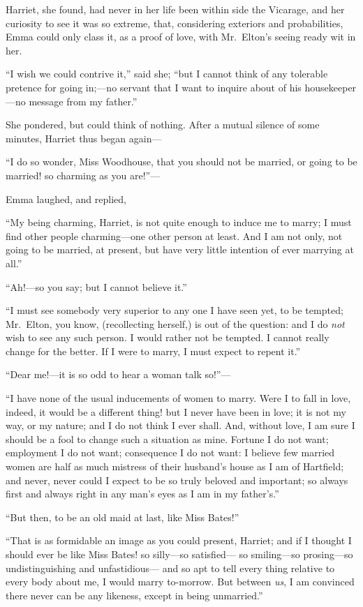 Harriet, she found, had never in her life been within side the Vicarage,
and her curiosity to see it was so extreme, that, considering exteriors
and probabilities, Emma could only class it, as a proof of love,
with Mr.\ Elton's seeing ready wit in her.

``I wish we could contrive it,'' said she; ``but I cannot think
of any tolerable pretence for going in;---no servant that I want
to inquire about of his housekeeper---no message from my father.''

She pondered, but could think of nothing.  After a mutual silence
of some minutes, Harriet thus began again---%

``I do so wonder, Miss Woodhouse, that you should not be married,
or going to be married! so charming as you are!''---%

Emma laughed, and replied,

``My being charming, Harriet, is not quite enough to induce me to marry;
I must find other people charming---one other person at least.
And I am not only, not going to be married, at present, but have
very little intention of ever marrying at all.''

``Ah!---so you say; but I cannot believe it.''

``I must see somebody very superior to any one I have seen yet,
to be tempted; Mr.\ Elton, you know, (recollecting herself,)
is out of the question:  and I do \emph{not} wish to see any such person.
I would rather not be tempted.  I cannot really change for the better.
If I were to marry, I must expect to repent it.''

``Dear me!---it is so odd to hear a woman talk so!''---%

``I have none of the usual inducements of women to marry.
Were I to fall in love, indeed, it would be a different thing!
but I never have been in love; it is not my way, or my nature;
and I do not think I ever shall.  And, without love, I am sure I
should be a fool to change such a situation as mine.  Fortune I
do not want; employment I do not want; consequence I do not want:
I believe few married women are half as much mistress of their
husband's house as I am of Hartfield; and never, never could I expect
to be so truly beloved and important; so always first and always
right in any man's eyes as I am in my father's.''

``But then, to be an old maid at last, like Miss Bates!''

``That is as formidable an image as you could present, Harriet; and if I
thought I should ever be like Miss Bates! so silly---so satisfied---%
so smiling---so prosing---so undistinguishing and unfastidious---%
and so apt to tell every thing relative to every body about me,
I would marry to-morrow. But between \emph{us}, I am convinced there never
can be any likeness, except in being unmarried.''

